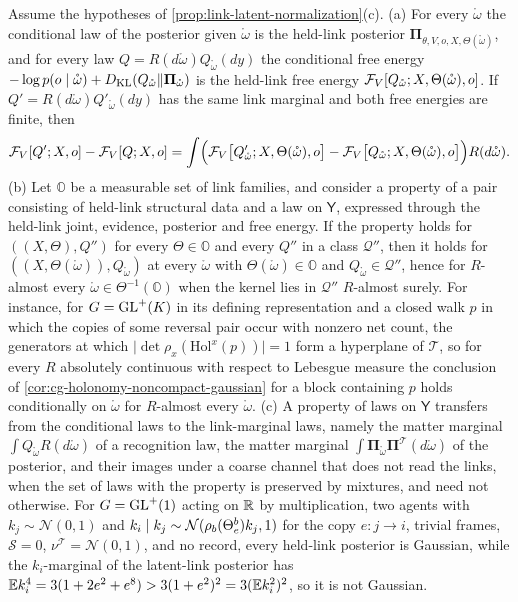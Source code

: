 Assume the hypotheses of \cref{prop:link-latent-normalization}(c).
(a) For every $\mathring\omega$ the conditional law of the posterior given $\mathring\omega$ is the held-link
posterior $\boldsymbol\Pi_{\theta,V,o,X,\Theta(\mathring\omega)}$, and for every law
$Q=R(d\mathring\omega)Q_{\mathring\omega}(dy)$ the conditional free energy
$-\log p(o\mid\mathring\omega)+D_{\mathrm{KL}}(Q_{\mathring\omega}\Vert\boldsymbol\Pi_{\mathring\omega})$ is the held-link free energy
$\mathcal F_V[Q_{\mathring\omega};X,\Theta(\mathring\omega),o]$. If $Q'=R(d\mathring\omega)Q'_{\mathring\omega}(dy)$ has the same link
marginal and both free energies are finite, then
\begin{equation}
\mathcal F_V[Q';X,o]-\mathcal F_V[Q;X,o]
=\int\Bigl(\mathcal F_V\bigl[Q'_{\mathring\omega};X,\Theta(\mathring\omega),o\bigr]-\mathcal F_V\bigl[Q_{\mathring\omega};X,\Theta(\mathring\omega),o\bigr]\Bigr)R(d\mathring\omega).
\label{eq:link-transfer-potential}
\end{equation}
(b) Let $\mathbb O$ be a measurable set of link families, and consider a property of a pair consisting of
held-link structural data and a law on $\mathsf Y$, expressed through the held-link joint, evidence,
posterior and free energy. If the property holds for $((X,\Theta),Q'')$ for every $\Theta\in\mathbb O$ and
every $Q''$ in a class $\mathcal Q''$, then it holds for $((X,\Theta(\mathring\omega)),Q_{\mathring\omega})$ at every
$\mathring\omega$ with $\Theta(\mathring\omega)\in\mathbb O$ and $Q_{\mathring\omega}\in\mathcal Q''$, hence for $R$-almost
every $\mathring\omega\in\Theta^{-1}(\mathbb O)$ when the kernel lies in $\mathcal Q''$ $R$-almost surely. For instance, for
$G=\mathrm{GL}^+(K)$ in its defining representation and a closed walk $p$ in which the copies of some reversal pair
occur with nonzero net count, the generators at which $\lvert\det\rho_x(\mathrm{Hol}^x(p))\rvert=1$ form a
hyperplane of $\mathscr T$, so for every $R$ absolutely continuous with respect to Lebesgue measure the
conclusion of \cref{cor:cg-holonomy-noncompact-gaussian} for a block containing $p$ holds conditionally on
$\mathring\omega$ for $R$-almost every $\mathring\omega$.
(c) A property of laws on $\mathsf Y$ transfers from the conditional laws to the link-marginal laws, namely
the matter marginal $\int Q_{\mathring\omega}R(d\mathring\omega)$ of a recognition law, the matter marginal
$\int\boldsymbol\Pi_{\mathring\omega}\boldsymbol\Pi^{\mathscr T}(d\mathring\omega)$ of the posterior, and their images under a coarse
channel that does not read the links, when the set of laws with the property is preserved by mixtures, and
need not otherwise. For $G=\mathrm{GL}^+(1)$ acting on $\mathbb R$ by multiplication, two agents with
$k_j\sim\mathcal N(0,1)$ and $k_i\mid k_j\sim\mathcal N(\rho_b(\Theta^b_e)k_j,1)$ for the copy $e:j\to i$, trivial
frames, $\mathscr S=0$, $\nu^{\mathscr T}=\mathcal N(0,1)$, and no record, every held-link posterior is Gaussian,
while the $k_i$-marginal of the latent-link posterior has
$\mathbb E k_i^4=3(1+2e^2+e^8)>3(1+e^2)^2=3(\mathbb E k_i^2)^2$, so it is not Gaussian. 

